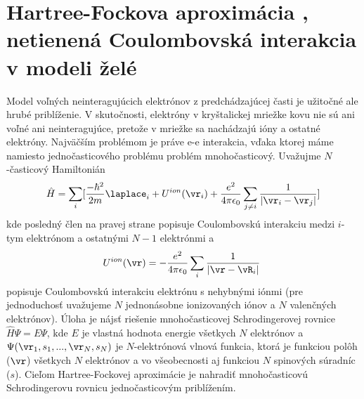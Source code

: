 
\section{Hartree-Fockova aproximácia , netienená Coulombovská interakcia v modeli želé }

Model voľných neinteragujúcich elektrónov z predchádzajúcej časti je užitočné ale hrubé priblíženie. V skutočnosti, elektróny v kryštalickej mriežke kovu nie sú ani voľné ani neinteragujúce, pretože v mriežke sa nachádzajú ióny a ostatné elektróny. Najväčším problémom je práve e-e interakcia, vďaka ktorej máme namiesto jednočasticového problému problém mnohočasticový.
Uvažujme $N$-časticový Hamiltonián
\begin{equation}
 \label{eq:hrtf_ham}
\hat{H}=\sum_i [ \frac{-\hbar^2}{2m}\laplace_i +U^{ion}(\vr_i)+\frac{e^2}{4\pi\epsilon_0}\sum_{j\neq i}\frac{1}{|\vr_i-\vr_j|} ]
\end{equation}
kde posledný člen na pravej strane popisuje Coulombovskú interakciu medzi $i$-tym elektrónom a ostatnými $N-1$ elektrónmi  a
\begin{equation}
 \label{eq:ion}
 U^{ion}(\vr)=-\frac{e^2}{4\pi \epsilon_0}\sum_i{\frac{1}{|\vr-\vR_i|}} \text{ }
\end{equation}
popisuje Coulombovskú interakciu elektrónu s nehybnými iónmi (pre jednoduchosť uvažujeme $N$ jednonásobne ionizovaných iónov a $N$ valenčných elektrónov).
Úloha je nájsť riešenie mnohočasticovej Schrodingerovej rovnice $\hat{H} \Psi = E \Psi$, kde $E$ je vlastná hodnota energie všetkych $N$ elektrónov a  $\Psi(\vr_1,s_1,...,\vr_N,s_N)$ je $N$-elektrónová vlnová funkcia, ktorá je funkciou polôh ($\vr$) všetkych $N$ elektrónov
a vo všeobecnosti aj funkciou $N$ spinových súradníc ($s$).
Cieľom Hartree-Fockovej aproximácie
je nahradiť mnohočasticovú Schrodingerovu rovnicu jednočasticovým priblížením.

